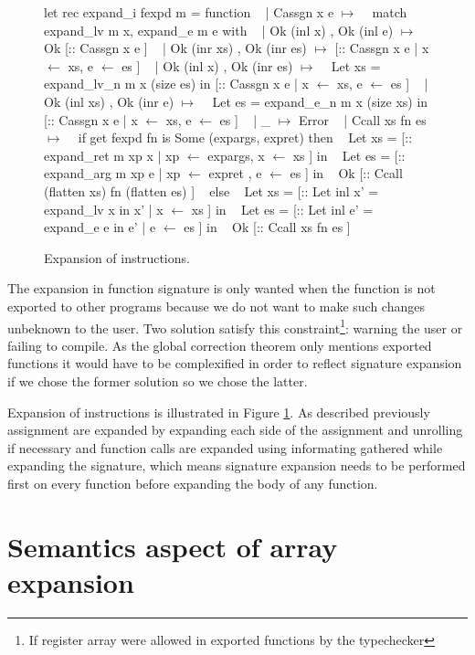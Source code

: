 \documentclass{article}
\begin{document}
\begin{figure}[t]
\obeylines\obeyspaces\ttfamily%
let rec expand\_i fexpd m = function
~ | Cassgn x e \(\mapsto\)
~   match expand\_lv m x, expand\_e m e    with
~   | Ok (inl x)       , Ok (inl e)      \(\mapsto\) Ok [:: Cassgn x e ]
~   | Ok (inr xs)      , Ok (inr es)     \(\mapsto\) [:: Cassgn x e | x \(\leftarrow\) xs, e \(\leftarrow\) es ]
~   | Ok (inl x)       , Ok (inr es)     \(\mapsto\)
~     Let xs = expand\_lv\_n m x (size es) in [:: Cassgn x e | x \(\leftarrow\) xs, e \(\leftarrow\) es ]
~   | Ok (inl xs)      , Ok (inr e)      \(\mapsto\)
~     Let es = expand\_e\_n  m x (size xs) in [:: Cassgn x e | x \(\leftarrow\) xs, e \(\leftarrow\) es ]
~   | \_                                  \(\mapsto\) Error
~ | Ccall xs fn es \(\mapsto\)
~   if get fexpd fn is Some (expargs, expret) then
~     Let xs = [:: expand\_ret m xp x | xp \(\leftarrow\) expargs, x \(\leftarrow\) xs ] in
~     Let es = [:: expand\_arg m xp e | xp \(\leftarrow\) expret , e \(\leftarrow\) es ] in
~     Ok [:: Ccall (flatten xs) fn (flatten es) ]
~   else
~     Let xs = [:: Let inl x' = expand\_lv x in x' | x \(\leftarrow\) xs ] in
~     Let es = [:: Let inl e' = expand\_e e  in e' | e \(\leftarrow\) es ] in
~     Ok [:: Ccall xs fn es ]
\normalfont%
\caption{Expansion of instructions.}\label{fig:insexp}
\end{figure}

\smallskip

The expansion in function signature is only wanted when the function is not
exported to other programs because we do not want to make such changes unbeknown
to the user. Two solution satisfy this constraint\footnote{If register array
were allowed in exported functions by the typechecker}: warning the user or
failing to compile. As the global correction theorem only mentions exported
functions it would have to be complexified in order to reflect signature
expansion if we chose the former solution so we chose the latter.

\medskip

Expansion of instructions is illustrated in Figure \ref{fig:insexp}. As
described previously assignment are expanded by expanding each side of the
assignment and unrolling if necessary and function calls are expanded using
informating gathered while expanding the signature, which means signature
expansion needs to be performed first on every function before expanding the
body of any function.

\section{Semantics aspect of array expansion}\label{sec:semantics}
\end{document}
